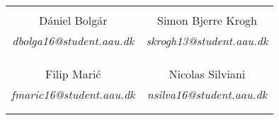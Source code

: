 








\begin{table}[H]
	\centering
	\vspace{50em}
		\begin{tabular}{c c }
			\underline{\phantom{mmmmmmmmmmmmmmmmmmm}}       & \underline{\phantom{mmmmmmmmmmmmmmmmmmm}} \\
			Dániel Bolgár			 & Simon Bjerre Krogh  \\
			\textit{dbolga16@student.aau.dk} & \textit{skrogh13@student.aau.dk}\\
			&\\
			&\\
			\underline{\phantom{mmmmmmmmmmmmmmmmmmm}}       & \underline{\phantom{mmmmmmmmmmmmmmmmmmm}} \\
		    Filip Marić			 & Nicolas Silviani\\
			\textit{fmaric16@student.aau.dk} & \textit{nsilva16@student.aau.dk} \\
			&\\
			&\\	
		\end{tabular}
\end{table}